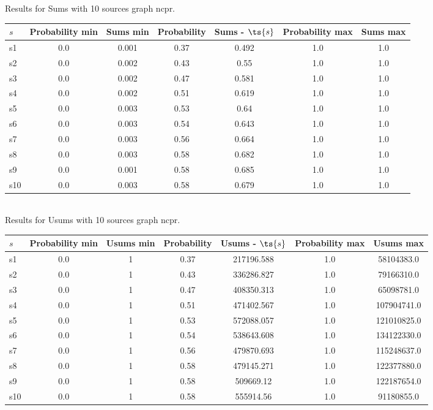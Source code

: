 \documentclass{article}
\begin{document}
\noindent Results for Sums with 10 sources graph ncpr.

\noindent\begin{tabular}{|l|c|c|c|c|c|c|}
\hline
$s$& Probability min & Sums min & Probability & Sums - $\ts{s}$ & Probability max & Sums max\\
\hline
s1 &0.0 & 0.001 & 0.37 & 0.492 & 1.0 & 1.0\\
\hline
s2 &0.0 & 0.002 & 0.43 & 0.55 & 1.0 & 1.0\\
\hline
s3 &0.0 & 0.002 & 0.47 & 0.581 & 1.0 & 1.0\\
\hline
s4 &0.0 & 0.002 & 0.51 & 0.619 & 1.0 & 1.0\\
\hline
s5 &0.0 & 0.003 & 0.53 & 0.64 & 1.0 & 1.0\\
\hline
s6 &0.0 & 0.003 & 0.54 & 0.643 & 1.0 & 1.0\\
\hline
s7 &0.0 & 0.003 & 0.56 & 0.664 & 1.0 & 1.0\\
\hline
s8 &0.0 & 0.003 & 0.58 & 0.682 & 1.0 & 1.0\\
\hline
s9 &0.0 & 0.001 & 0.58 & 0.685 & 1.0 & 1.0\\
\hline
s10 &0.0 & 0.003 & 0.58 & 0.679 & 1.0 & 1.0\\
\hline
\end{tabular}\\

\noindent Results for Usums with 10 sources graph ncpr.

\noindent\begin{tabular}{|l|c|c|c|c|c|c|}
\hline
$s$& Probability min & Usums min & Probability & Usums - $\ts{s}$ & Probability max & Usums max\\
\hline
s1 &0.0 & 1 & 0.37 & 217196.588 & 1.0 & 58104383.0\\
\hline
s2 &0.0 & 1 & 0.43 & 336286.827 & 1.0 & 79166310.0\\
\hline
s3 &0.0 & 1 & 0.47 & 408350.313 & 1.0 & 65098781.0\\
\hline
s4 &0.0 & 1 & 0.51 & 471402.567 & 1.0 & 107904741.0\\
\hline
s5 &0.0 & 1 & 0.53 & 572088.057 & 1.0 & 121010825.0\\
\hline
s6 &0.0 & 1 & 0.54 & 538643.608 & 1.0 & 134122330.0\\
\hline
s7 &0.0 & 1 & 0.56 & 479870.693 & 1.0 & 115248637.0\\
\hline
s8 &0.0 & 1 & 0.58 & 479145.271 & 1.0 & 122377880.0\\
\hline
s9 &0.0 & 1 & 0.58 & 509669.12 & 1.0 & 122187654.0\\
\hline
s10 &0.0 & 1 & 0.58 & 555914.56 & 1.0 & 91180855.0\\
\hline
\end{tabular}\\
\end{document}
